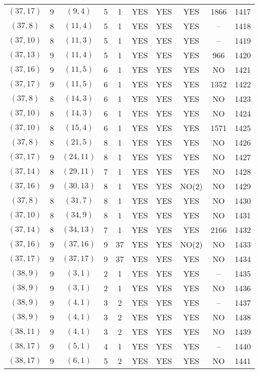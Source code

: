\begin{longtable}{|c|c|c|c|c|c|c|c|c|c|}
$(37, 17)$ & 9 & $(9, 4)$ & 5 & 1 & YES & YES & YES & 1866 & 1417\\
$(37, 8)$ & 8 & $(11, 4)$ & 5 & 1 & YES & YES & YES & -- & 1418\\
$(37, 10)$ & 8 & $(11, 3)$ & 5 & 1 & YES & YES & YES & -- & 1419\\
$(37, 13)$ & 9 & $(11, 4)$ & 5 & 1 & YES & YES & YES & 966 & 1420\\
$(37, 16)$ & 9 & $(11, 5)$ & 6 & 1 & YES & YES & YES & NO & 1421\\
$(37, 17)$ & 9 & $(11, 5)$ & 6 & 1 & YES & YES & YES & 1352 & 1422\\
$(37, 8)$ & 8 & $(14, 3)$ & 6 & 1 & YES & YES & YES & NO & 1423\\
$(37, 10)$ & 8 & $(14, 3)$ & 6 & 1 & YES & YES & YES & NO & 1424\\
$(37, 10)$ & 8 & $(15, 4)$ & 6 & 1 & YES & YES & YES & 1571 & 1425\\
$(37, 8)$ & 8 & $(21, 5)$ & 8 & 1 & YES & YES & YES & NO & 1426\\
$(37, 17)$ & 9 & $(24, 11)$ & 8 & 1 & YES & YES & YES & NO & 1427\\
$(37, 14)$ & 8 & $(29, 11)$ & 7 & 1 & YES & YES & YES & NO & 1428\\
$(37, 16)$ & 9 & $(30, 13)$ & 8 & 1 & YES & YES & NO(2) & NO & 1429\\
$(37, 8)$ & 8 & $(31, 7)$ & 8 & 1 & YES & YES & YES & NO & 1430\\
$(37, 10)$ & 8 & $(34, 9)$ & 8 & 1 & YES & YES & YES & NO & 1431\\
$(37, 14)$ & 8 & $(34, 13)$ & 7 & 1 & YES & YES & YES & 2166 & 1432\\
$(37, 16)$ & 9 & $(37, 16)$ & 9 & 37 & YES & YES & NO(2) & NO & 1433\\
$(37, 17)$ & 9 & $(37, 17)$ & 9 & 37 & YES & YES & YES & NO & 1434\\
$(38, 9)$ & 9 & $(3, 1)$ & 2 & 1 & YES & YES & YES & -- & 1435\\
$(38, 9)$ & 9 & $(3, 1)$ & 2 & 1 & YES & YES & YES & NO & 1436\\
$(38, 9)$ & 9 & $(4, 1)$ & 3 & 2 & YES & YES & YES & -- & 1437\\
$(38, 9)$ & 9 & $(4, 1)$ & 3 & 2 & YES & YES & YES & NO & 1438\\
$(38, 11)$ & 9 & $(4, 1)$ & 3 & 2 & YES & YES & YES & NO & 1439\\
$(38, 17)$ & 9 & $(5, 1)$ & 4 & 1 & YES & YES & YES & -- & 1440\\
$(38, 17)$ & 9 & $(6, 1)$ & 5 & 2 & YES & YES & YES & NO & 1441\\

\end{longtable}
